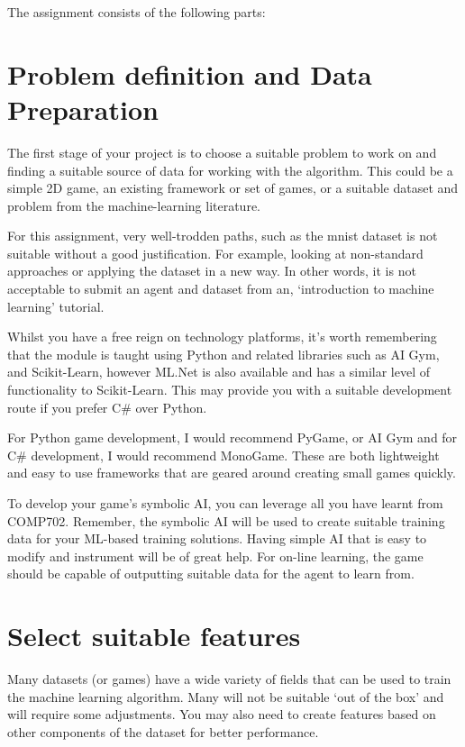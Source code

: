 \documentclass{../fal_assignment}
\begin{document}
The assignment consists of the following parts:

\section*{Problem definition and Data Preparation}
The first stage of your project is to choose a suitable problem to work on and finding a suitable source of data for working with the algorithm. This could be a simple 2D game, an existing framework or set of games, or a suitable dataset and problem from the machine-learning literature.

For this assignment, very well-trodden paths, such as the mnist dataset is not suitable without a good justification. For example, looking at non-standard approaches or applying the dataset in a new way. In other words, it is not acceptable to submit an agent and dataset from an, `introduction to machine learning' tutorial.

Whilst you have a free reign on technology platforms, it's worth remembering that the module is taught using Python and related libraries such as AI Gym, and Scikit-Learn, however ML.Net is also available and has a similar level of functionality to Scikit-Learn. This may provide you with a suitable development route if you prefer C\# over Python.

For Python game development, I would recommend PyGame, or AI Gym and for C\# development, I would recommend MonoGame. These are both lightweight and easy to use frameworks that are geared around creating small games quickly.

To develop your game’s symbolic AI, you can leverage all you have learnt from COMP702. Remember, the symbolic AI will be used to create suitable training data for your ML-based training solutions. Having simple AI that is easy to modify and instrument will be of great help. For on-line learning, the game should be capable of outputting suitable data for the agent to learn from.

\section*{Select suitable features}
Many datasets (or games) have a wide variety of fields that can be used to train the machine learning algorithm. Many will not be suitable `out of the box' and will require some adjustments. You may also need to create features based on other components of the dataset for better performance.
\end{document}
